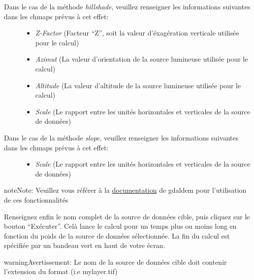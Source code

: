 \documentclass[letterpaper,10pt,french]{sphinxmanual}
\begin{document}
\begin{description}
\item[{Dans le cas de la méthode \emph{hillshade}, veuillez renseigner les informations suivantes dans les chmaps prévus à cet effet:}] \leavevmode\begin{itemize}
\item {} 
\emph{Z-Factor} (Facteur ``Z'', soit la valeur d'éxagération verticale utilisée pour le calcul)

\item {} 
\emph{Azimut} (La valeur d'orientation de la source lumineuse utilisée pour le calcul)

\item {} 
\emph{Altitude} (La valeur d'altitude de la source lumineuse utilisée pour le calcul)

\item {} 
\emph{Scale} (Le rapport entre les unités horizontales et verticales de la source de données)

\end{itemize}

\item[{Dans le cas de la méthode \emph{slope}, veuillez renseigner les informations suivantes dans les chmaps prévus à cet effet:}] \leavevmode\begin{itemize}
\item {} 
\emph{Scale} (Le rapport entre les unités horizontales et verticales de la source de données)

\end{itemize}

\end{description}

\begin{notice}{note}{Note:}
Veuillez vous référer à la \href{http://www.gdal.org/gdaldem.html}{documentation} de gdaldem pour l'utilisation de ces fonctionnalités
\end{notice}

Renseignez enfin le nom complet de la source de données cible, puis cliquez sur le bouton ``Exécuter''. Celà lance le calcul pour un temps plus ou moins long en fonction du poids de la source de données sélectionnée. La fin du calcul est spécifiée par un bandeau vert en haut de votre écran.

\begin{notice}{warning}{Avertissement:}
Le nom de la source de données cible doit contenir l'extension du format (i.e mylayer.tif)
\end{notice}
\end{document}
